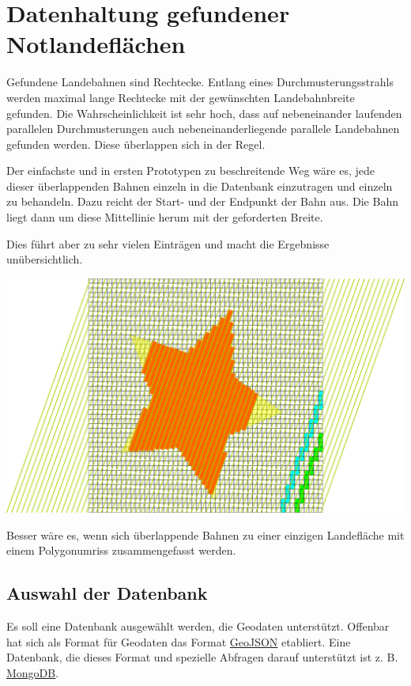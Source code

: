 \documentclass[
11pt, %
a4paper, %
oneside, %
pdfspacing, %
headinclude,
BCOR5mm, %
ngerman, %
bibtotocnumbered,
]{scrartcl}
\begin{document}
\section{Datenhaltung gefundener Notlandeflächen}

Gefundene Landebahnen sind Rechtecke. Entlang eines Durchmusterungsstrahls werden maximal lange Rechtecke mit der gewünschten Landebahnbreite gefunden. Die Wahrscheinlichkeit ist sehr hoch, dass auf nebeneinander laufenden parallelen Durchmusterungen auch nebeneinanderliegende parallele Landebahnen gefunden werden. Diese überlappen sich in der Regel. 

Der einfachste und in ersten Prototypen zu beschreitende Weg wäre es, jede dieser überlappenden Bahnen einzeln in die Datenbank einzutragen und einzeln zu behandeln. Dazu reicht der Start- und der Endpunkt der Bahn aus. Die Bahn liegt dann um diese Mittellinie herum mit der geforderten Breite.

Dies führt aber zu sehr vielen Einträgen und macht die Ergebnisse unübersichtlich.

\includegraphics[width=\textwidth]{./drawings/ueberlappendeBahnen.png}

Besser wäre es, wenn sich überlappende Bahnen zu einer einzigen Landefläche mit einem Polygonumriss zusammengefasst werden. 

\subsection{Auswahl der Datenbank}

Es soll eine Datenbank ausgewählt werden, die Geodaten unterstützt. Offenbar hat sich als Format für Geodaten das Format \href{http://geojson.org/}{GeoJSON} etabliert. Eine Datenbank, die dieses Format und spezielle Abfragen darauf unterstützt ist z. B. \href{https://docs.mongodb.com/}{MongoDB}.
\end{document}
